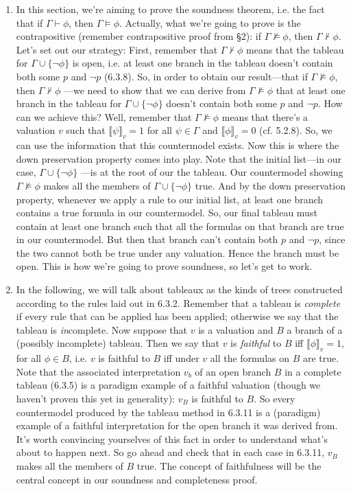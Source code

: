 \begin{enumerate}[\thesection.1]
		
  \item In this section, we're aiming to prove the soundness theorem, i.e. the fact that if
	$\Gamma\vdash \phi$,
	then
	$\Gamma\vDash\phi$.
	Actually, what we're going to prove is the contrapositive (remember contrapositive proof from \S2): if
	$\Gamma\nvDash \phi$,
	then
	$\Gamma\nvdash\phi$.
	Let's set out our strategy: First, remember that
	$\Gamma\nvdash \phi$
	means that the tableau for
	$\Gamma\cup\{\neg\phi\}$
	is open, i.e. at least one branch in the tableau doesn't contain both some $p$ and $\neg p$ (6.3.8).
	So, in order to obtain our result---that if
	$\Gamma\nvDash\phi$,
	then
	$\Gamma\nvdash\phi$
	---we need to show that we can derive from
	$\Gamma\nvDash\phi$
	that at least one branch in the tableau for
	$\Gamma\cup\{\neg\phi\}$
	doesn't contain both some $p$ and $\neg p$.
	How can we achieve this?
	Well, remember that
	$\Gamma\nvDash \phi$
	means that there's a valuation $v$ such that
	$\llbracket \psi\rrbracket_v=1$
	for all
	$\psi\in\Gamma$
	and
	$\llbracket\phi\rrbracket_v=0$
	(cf. 5.2.8).
	So, we can use the information that this countermodel exists.
	Now this is where the down preservation property comes into play.
	Note that the initial list---in our case,
	$\Gamma\cup\{\neg\phi\}$
	---is at the root of our the tableau.
	Our countermodel showing
	$\Gamma\nvDash \phi$
	makes all the members of
	$\Gamma\cup\{\neg\phi\}$
	true.
	And by the down preservation property, whenever we apply a rule to our initial list, at least one branch contains a true formula in our countermodel.
	So, our final tableau must contain at least one branch such that all the formulas on that branch are true in our countermodel.
	But then that branch can't contain both $p$ and $\neg p$, since the two cannot both be true under any valuation.
	Hence the branch must be open. This is how we're going to prove soundness, so let's get to work.
		
	\item In the following, we will talk about tableaux as the kinds of trees constructed according to the rules laid out in 6.3.2. Remember that a tableau is \emph{complete} if every rule that can be applied has been applied; otherwise we say that the tableau is \emph{in}complete. Now suppose that $v$ is a valuation and $B$ a branch of a (possibly incomplete) tableau. Then we say that $v$ is \emph{faithful} to $B$ iff $\llbracket\phi\rrbracket_v=1$, for all $\phi\in B$, i.e. $v$ is faithful to $B$ iff under $v$ all the formulas on $B$ are true. Note that the associated interpretation $v_b$ of an open branch $B$ in a complete tableau (6.3.5) is a paradigm example of a faithful valuation (though we haven't proven this yet in generality): $v_B$ is faithful to $B$. So every countermodel produced by the tableau method in 6.3.11 is a (paradigm) example of a faithful interpretation for the open branch it was derived from. It's worth convincing yourselves of this fact in order to understand what's about to happen next. So go ahead and check that in each case in 6.3.11, $v_B$ makes all the members of $B$ true. The concept of faithfulness will be the central concept in our soundness and completeness proof.
			

\end{enumerate}
